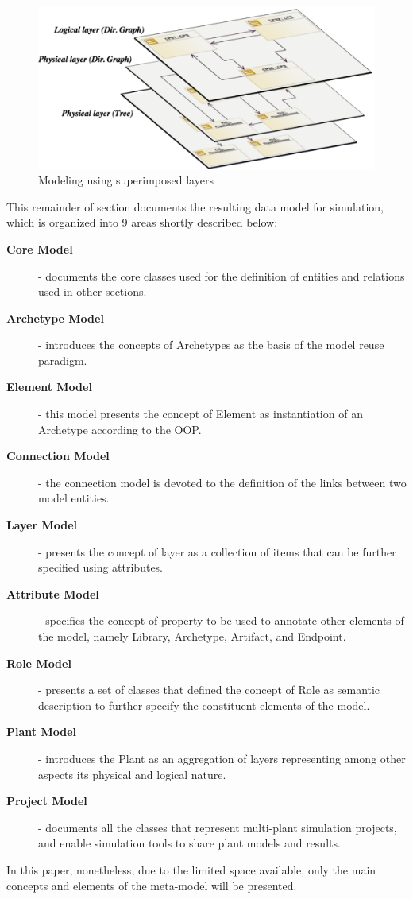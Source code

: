 \begin{figure}
	\vspace*{-0.5cm}
	\centering
	\includegraphics[width=\linewidth]{images/layers2}
	\caption{Modeling using superimposed layers}
	\label{fig:layers}
\end{figure}

This remainder of section documents the resulting data model for simulation, which is organized into 9 areas shortly described below:

\begin{description}
	\item[\textbf{Core Model}] - documents the core classes used for the definition of  entities and relations used in other sections.
	\item [\textbf{Archetype Model}] - introduces the concepts of Archetypes as the basis of the model reuse paradigm.
	\item[\textbf{Element Model}] - this model presents the concept of Element as instantiation of an Archetype according to the OOP.
	\item[\textbf{Connection Model}] - the connection model is devoted to the definition of the links between two model entities.
	\item[\textbf{Layer Model}] -  presents the concept of layer as a collection of items that can be further specified using attributes. 
	\item[\textbf{Attribute Model}] - specifies the concept of property to be used to annotate other elements of the model, namely Library, Archetype, Artifact, and Endpoint.
	\item[\textbf{Role Model}] - presents a set of classes that defined the concept of Role as semantic description to further specify the constituent elements of the model.
	\item[\textbf{Plant Model}] - introduces the Plant as an aggregation of layers representing among other aspects its physical and logical nature. 
	\item[\textbf{Project Model}] - documents all the classes that represent multi-plant simulation projects, and enable simulation tools to share plant models and results.
\end{description}
In this paper, nonetheless, due to the limited space available, only the main concepts and elements of the meta-model will be presented. 

